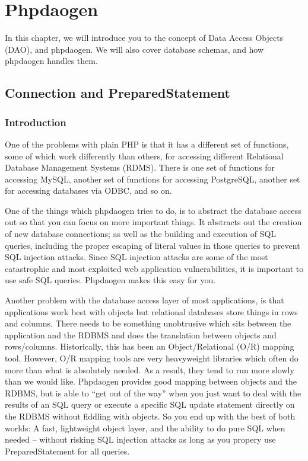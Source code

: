 \documentclass[letterpaper,10pt,english]{sphinxmanual}
\begin{document}
\chapter{Phpdaogen}
\label{jaxFrameworkGuide:id13}
In this chapter, we will introduce you to the concept of Data Access Objects (DAO), and phpdaogen.
We will also cover database schemas, and how phpdaogen handles them.


\section{Connection and PreparedStatement}
\label{jaxFrameworkGuide:connection-and-preparedstatement}

\subsection{Introduction}
\label{jaxFrameworkGuide:id14}
One of the problems with plain PHP is that it has a different set of functions, some of which work
differently than others, for accessing different Relational Database Management Systems (RDMS).
There is one set of functions for accessing MySQL, another set of functions for accessing
PostgreSQL, another set for accessing databases via ODBC, and so on.

One of the things which phpdaogen tries to do, is to abstract the database access out so that you
can focus on more important things.  It abstracts out the creation of new database connections; as
well as the building and execution of SQL queries, including the proper escaping of literal values
in those queries to prevent SQL injection attacks.  Since SQL injection attacks are some of the most
catastrophic and most exploited web application vulnerabilities, it is important to use safe SQL
queries.  Phpdaogen makes this easy for you.

Another problem with the database access layer of most applications, is that applications work best
with objects but relational databases store things in rows and columns.  There needs to be something
unobtrusive which sits between the application and the RDBMS and does the translation between
objects and rows/columns.  Historically, this has been an Object/Relational (O/R) mapping tool.
However, O/R mapping tools are very heavyweight libraries which often do more than what is
absolutely needed.  As a result, they tend to run more slowly than we would like.  Phpdaogen
provides good mapping between objects and the RDBMS, but is able to ``get out of the way'' when you
just want to deal with the results of an SQL query or execute a specific SQL update statement
directly on the RDBMS without fiddling with objects.  So you end up with the best of both worlds: A
fast, lightweight object layer, and the ability to do pure SQL when needed -- without risking SQL
injection attacks as long as you propery use PreparedStatement for all queries.
\end{document}
